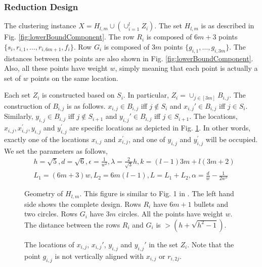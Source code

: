\documentclass{article}
\begin{document}
\subsubsection{Reduction Design}
The clustering instance $X = H_{l,m} \cup (\cup_{i=1}^l Z_i)$. The set $H_{l,m}$ is as described in Fig. \ref{fig:lowerBoundComponent}. The row $R_i$ is composed of $6m + 3$ points $\{s_i, r_{i, 1}, \ldots, r_{i, 6m+1}, f_i\}$. Row $G_i$ is composed of $3m$ points $\{g_{i,1}, \ldots, g_{i, 3m}\}$. The distances between the points are also shown in Fig. \ref{fig:lowerBoundComponent}. Also, all these points have weight $w$, simply meaning that each point is actually a set of $w$ points on the same location.

Each set $Z_i$ is constructed based on $S_i$. In particular, $Z_i = \cup_{j\in [3m]} B_{i,j}$. The construction of $B_{i,j}$ is as follows. $x_{i,j} \in B_{i,j}$ iff $j \not\in S_i$ and $x_{i,j}' \in B_{i,j}$ iff $j \in S_i$. Similarly,  $y_{i,j} \in B_{i,j}$ iff $j \not\in S_{i+1}$ and $y_{i,j}' \in B_{i,j}$ iff $j \in S_{i+1}$. The locations, $x_{i, j}, x_{i,j}^\prime, y_{i,j}$ and $y_{i, j}^\prime$ are specific locations as depicted in Fig. \ref{fig:ZFig}. In other words, exactly one of the locations $x_{i,j}$ and $x_{i,j}^\prime$, and one of $y_{i,j}$ and $y_{i,j}^\prime$ will be occupied. We set the parameters as follows, 
\vspace{-0.1in}
\begin{align*}
&h = \sqrt{5}, d = \sqrt{6}, \epsilon = \frac{1}{w^2}, \lambda = \frac{2}{\sqrt{3}}h, k = (l-1)3m + l(3m+2)\\
& L_1 = (6m+3)w, L_2 = 6m(l-1), L = L_1 + L_2, \alpha = \frac{d}{w}-\frac{1}{2w^3}
\end{align*}


  \begin{figure}[!tbp]
  \centering
  \begin{minipage}[b]{0.49\textwidth}
    \resizebox{\linewidth}{!}{}
    \caption{Geometry of $H_{l,m}$. This figure is similar to Fig. 1 in \cite{vattani2009hardness}. The left hand side shows the complete design. Rows $R_i$ have $6m+1$ bullets and two circles. Rows $G_i$ have $3m$ circles. All the points have weight $w$. The distance between the rows $R_i$ and $G_i$ is $> (h+\sqrt{h^2-1})$.}
    \label{fig:lowerBoundComponent}
  \end{minipage}
  \hfill
  \begin{minipage}[b]{0.49\textwidth}
    
    \caption{The locations of $x_{i,j}$, $x_{i,j}'$, $y_{i,j}$ and $y_{i,j}'$ in the set $Z_i$. Note that the point $g_{i,j}$ is not vertically aligned with $x_{i, j}$ or $r_{i, 2j}$.}
    \label{fig:ZFig}
  \end{minipage}
\end{figure}
\end{document}
